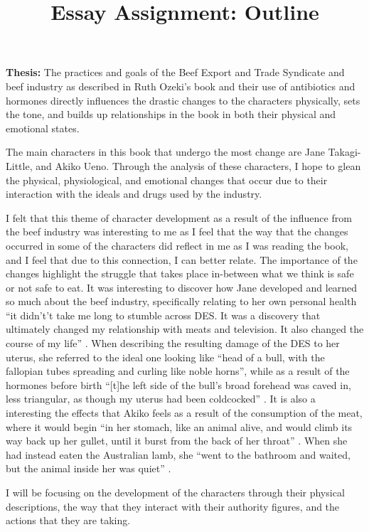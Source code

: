\documentclass{article}
\title{Essay Assignment: Outline}
\begin{document}
\makeheader
\textbf{Thesis:} The practices and goals of the Beef Export and Trade
Syndicate and beef industry as described in Ruth Ozeki's book
 and their use of antibiotics and hormones directly
influences the drastic changes to the characters physically, sets the tone,
and builds up relationships in the book in both their physical and emotional
states.

The main characters in this book that undergo the most change are Jane
Takagi-Little, and Akiko Ueno. Through the analysis of these characters, I
hope to glean the physical, physiological, and emotional changes that occur
due to their interaction with the ideals and drugs used by the industry.

I felt that this theme of character development as a result of the influence
from the beef industry was interesting to me as I feel that the way that the
changes occurred in some of the characters did reflect in me as I was
reading the book, and I feel that due to this connection, I can better
relate. The importance of the changes highlight the struggle that takes
place in-between what we think is safe or not safe to eat. It was
interesting to discover how Jane developed and learned so much about the
beef industry, specifically relating to her own personal health ``it
didn't’t take me long to stumble across DES. It was a discovery that
ultimately changed my relationship with meats and television. It also
changed the course of my life'' \cite{ozeki1998my}. When describing the
resulting damage of the DES to her uterus, she referred to the ideal one
looking like ``head of a bull, with the fallopian tubes spreading and
curling like noble horns'', while as a result of the hormones before birth
``[t]he left side of the bull’s broad forehead was caved in, less
triangular, as though my uterus had been coldcocked'' \cite{ozeki1998my}. It
is also a interesting the effects that Akiko feels as a result of the
consumption of the meat, where it would begin ``in her stomach, like an
animal alive, and would climb its way back up her gullet, until it burst
from the back of her throat'' \cite{ozeki1998my}. When she had instead eaten
the Australian lamb, she ``went to the bathroom and waited, but the animal
inside her was quiet'' \cite{ozeki1998my}. 

I will be focusing on the development of the characters through their
physical descriptions, the way that they interact with their authority
figures, and the actions that they are taking.



\makeworkscited
\end{document}
